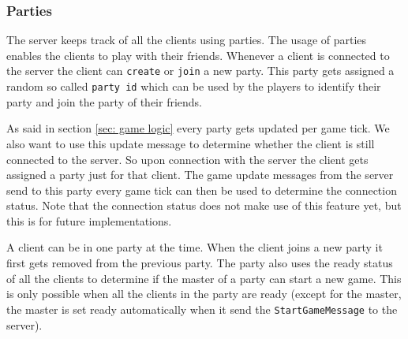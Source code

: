 \documentclass[../main.tex]{subfiles}
\begin{document}
        \subsubsection{Parties}
        The server keeps track of all the clients using parties. The usage of parties enables the clients to play with their friends. Whenever a client is connected to the server the client can \texttt{create} or \texttt{join} a new party. This party gets assigned a random so called \texttt{party id} which can be used by the players to identify their party and join the party of their friends.
        
        As said in section \ref{sec: game logic} every party gets updated per game tick. We also want to use this update message to determine whether the client is still connected to the server. So upon connection with the server the client gets assigned a party just for that client. The game update messages from the server send to this party every game tick can then be used to determine the connection status. Note that the connection status does not make use of this feature yet, but this is for future implementations.

        A client can be in one party at the time. When the client joins a new party it first gets removed from the previous party. The party also uses the ready status of all the clients to determine if the master of a party can start a new game. This is only possible when all the clients in the party are ready (except for the master, the master is set ready automatically when it send the \texttt{StartGameMessage} to the server).
\end{document}
